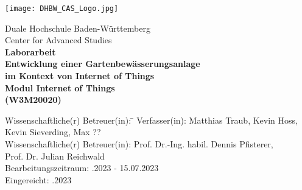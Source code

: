 \begin{titlepage}
    \begin{minipage}{\textwidth}
		\vspace{-2cm}
		\noindent \hfill \texttt{[image: DHBW\_CAS\_Logo.jpg]}
    \end{minipage}
    \vspace{1em}
    \begin{center}
        {\textsf{\large Duale Hochschule Baden-W\"urttemberg}}\\[6mm]
        {\textsf{\large Center for Advanced Studies}}\\[4em]
        {\textsf{\textbf{\large{}Laborarbeit}}}\\[6mm]
        {\textsf{\textbf{\Large{}Entwicklung einer Gartenbewässerungsanlage}}} \\[4mm]
        {\textsf{\textbf{\Large{}im Kontext von Internet of Things}}} \\[1.5cm]
        {\textsf{\textbf{\large{}Modul Internet of Things}}\\[6mm]
        \textsf{\textbf{(W3M20020)}}}\vspace{10em}
        
        \begin{minipage}{\textwidth}
            \begin{tabbing}
            Wissenschaftliche(r) Betreuer(in): \hspace{0.85cm}\=\kill
            Verfasser(in): \> Matthias Traub, Kevin Hoss, \\[1.5mm]
            \> Kevin Sieverding, Max ?? \\[1.5mm]
            Wissenschaftliche(r) Betreuer(in): \> Prof. Dr.-Ing. habil. Dennis Pfisterer, \\[1.5mm]
            \> Prof. Dr. Julian Reichwald \\[1.5mm]
            Bearbeitungszeitraum: .2023 - 15.07.2023 \\[1.5mm]
    		Eingereicht: .2023
            \end{tabbing}
        \end{minipage}
    \end{center}
\end{titlepage}